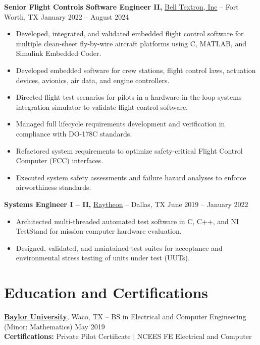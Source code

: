 \documentclass[11pt]{article}       %
\begin{document}
\textbf{Senior Flight Controls Software Engineer II,} \href{https://www.bellflight.com/}{Bell Textron, Inc} -- Fort Worth, TX \hfill January 2022 -- August 2024 \\
\vspace{-9pt}
\begin{itemize}
  \item Developed, integrated, and validated embedded flight control software for multiple clean-sheet fly-by-wire aircraft platforms using C, MATLAB, and Simulink Embedded Coder.
  \item Developed embedded software for crew stations, flight control laws, actuation devices, avionics, air data, and engine controllers.
  \item Directed flight test scenarios for pilots in a hardware-in-the-loop systems integration simulator to validate flight control software.
  \item Managed full lifecycle requirements development and verification in compliance with DO-178C standards.
  \item Refactored system requirements to optimize safety-critical Flight Control Computer (FCC) interfaces.
  \item Executed system safety assessments and failure hazard analyses to enforce airworthiness standards.
\end{itemize}

\textbf{Systems Engineer I -- II,} \href{https://www.rtx.com/}{Raytheon} -- Dallas, TX \hfill June 2019 -- January 2022 \\
\vspace{-9pt}
\begin{itemize}
  \item Architected multi-threaded automated test software in C, C++, and NI TestStand for mission computer hardware evaluation.
  \item Designed, validated, and maintained test suites for acceptance and environmental stress testing of units under test (UUTs).
\end{itemize}

\vspace{-18.5pt}

\section*{Education and Certifications}
\textbf{\href{https://www.baylor.edu/}{Baylor University}}, Waco, TX -- BS in Electrical and Computer Engineering (Minor: Mathematics) \hfill May 2019\\
\textbf{Certifications:} Private Pilot Certificate $|$ NCEES FE Electrical and Computer
\end{document}
